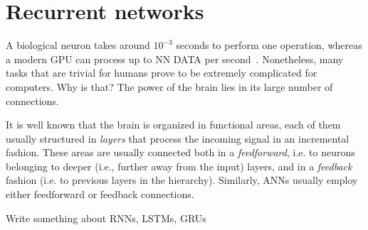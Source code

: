 \section{Recurrent networks}\label{sec:i}
A biological neuron takes around $10^{-3}$ seconds to perform one operation,
whereas a modern GPU can process up to NN DATA per second~\citep{NVIDIA}.
Nonetheless, many tasks that are trivial for humans prove to be extremely
complicated for computers. Why is that? The power of the brain lies in its
large number of connections.\cite{SOMETHING}

It is well known that the brain is organized in functional areas, each of them
usually structured in \emph{layers} that process the incoming signal in an
incremental fashion. These areas are usually connected both in a
\emph{feedforward}, i.e. to neurons belonging to deeper (i.e., further away
from the input) layers, and in a \emph{feedback} fashion (i.e. to previous
layers in the hierarchy). Similarly, ANNs usually employ either feedforward or
feedback connections.

Write something about RNNs, LSTMs, GRUs
